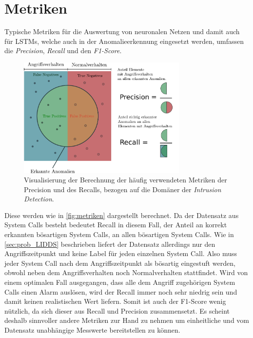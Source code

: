                 \fi

\section{Metriken}\label{sec:Metriken}

    Typische Metriken für die Auswertung von neuronalen Netzen und damit auch für \acp{LSTM}, welche auch in der Anomalieerkennung eingesetzt werden, umfassen die \textit{Precision}, \textit{Recall} und den \textit{F1-Score}.
    \begin{figure}
        \centering
        \includegraphics[width=0.75\textwidth]{images/Illustrationen/Precision.pdf}
        \caption[Darstellung Precision und Recall]{Visualisierung der Berechnung der häufig verwendeten Metriken der Precision und des Recalls, bezogen auf die Domäner der \textit{Intrusion Detection}.}\label{fig:metriken}
    \end{figure}
    Diese werden wie in \autoref{fig:metriken} dargestellt berechnet.
    Da der Datensatz aus System Calls besteht bedeutet Recall in diesem Fall, der Anteil an korrekt erkannten bösartigen System Calls, an allen bösartigen System Calls.
    Wie in \autoref{sec:prob_LIDDS} beschrieben liefert der Datensatz allerdings nur den Angriffszeitpunkt und keine Label für jeden einzelnen System Call.
    Also muss jeder System Call nach dem Angriffszeitpunkt als bösartig eingestuft werden, obwohl neben dem Angriffsverhalten noch Normalverhalten stattfindet.
    Wird von einem optimalen Fall ausgegangen, dass alle dem Angriff zugehörigen System Calls einen Alarm auslösen, wird der Recall immer noch sehr niedrig sein und damit keinen realistischen Wert liefern.
    Somit ist auch der F1-Score wenig nützlich, da sich dieser aus Recall und Precision zusammensetzt.
    Es scheint deshalb sinnvoller andere Metriken zur Hand zu nehmen um einheitliche und vom Datensatz unabhängige Messwerte bereitstellen zu können. 
